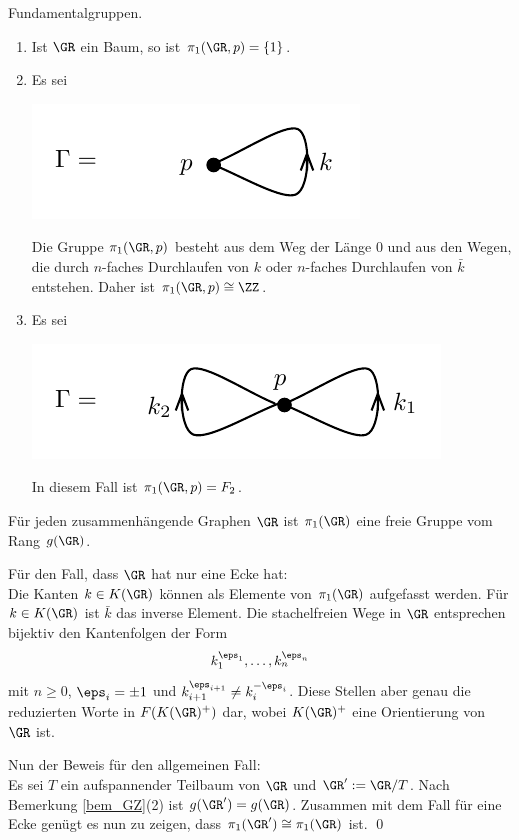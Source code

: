 \BSP Fundamentalgruppen.
\begin{enumerate}
\item Ist $\GR$ ein Baum, so ist $\pi_1(\GR,p)=\{1\}$.
\item Es sei
\begin{center}
	\includegraphics{grugraImages/pi1Z}
\end{center}
Die Gruppe $\pi_1(\GR,p)$ besteht aus dem Weg der Länge $0$
und aus den Wegen, die durch
$n$-faches Durchlaufen von $k$ oder $n$-faches Durchlaufen von
$\bar{k}$ entstehen. Daher ist $\pi_1(\GR,p)\cong\ZZ$.
\item Es sei
\begin{center}
	\includegraphics{grugraImages/pi1F2}
\end{center}
In diesem Fall ist $\pi_1(\GR,p)=F_2$.
\end{enumerate}

\PROP\label{prop_zusfrei}
Für jeden zusammenhängende Graphen $\GR$ ist $\pi_1(\GR)$
eine freie Gruppe vom Rang $g(\GR)$.

\bew Für den Fall, dass $\GR$ hat nur eine Ecke hat:\\
Die Kanten $k\in K(\GR)$ können als Elemente von $\pi_1(\GR)$
aufgefasst werden. Für $k\in K(\GR)$ ist $\bar{k}$ das inverse
Element. Die stachelfreien Wege in $\GR$ entsprechen bijektiv
den Kantenfolgen der Form
\[
k_1^{\eps_1},\ldots,k_n^{\eps_n}
\]
mit $n\geq 0$, $\eps_i=\pm 1$ und
$k_{i+1}^{\eps_{i+1}}\neq k_i^{-\eps_i}$.
Diese Stellen aber genau die reduzierten Worte in
$F(K(\GR)^+)$ dar, wobei $K(\GR)^+$ eine Orientierung von
$\GR$ ist.

Nun der Beweis für den allgemeinen Fall:\\
Es sei $T$ ein aufspannender Teilbaum
von $\GR$ und $\GR':=\GR/T$. Nach Bemerkung \ref{bem_GZ}(2) ist
$g(\GR')=g(\GR)$. Zusammen mit dem Fall für eine Ecke genügt es
nun zu zeigen, dass $\pi_1(\GR')\cong\pi_1(\GR)$ ist.
\qed


